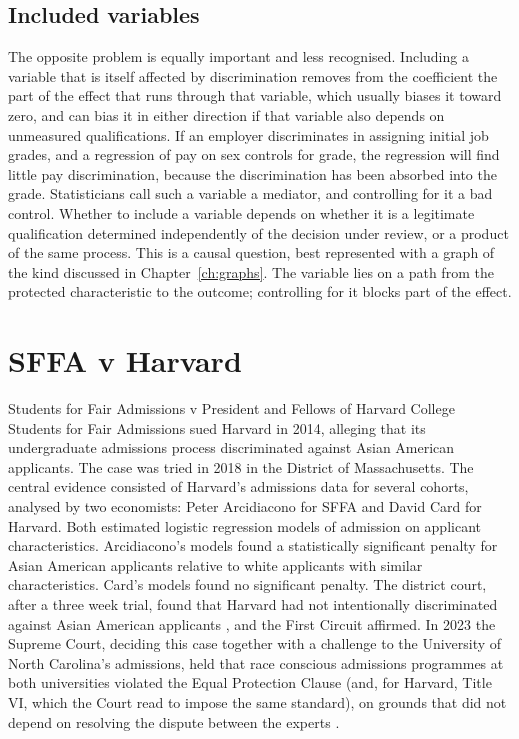 \subsection{Included variables}

The opposite problem is equally important and less recognised. Including a variable that is itself affected by discrimination removes from the coefficient the part of the effect that runs through that variable, which usually biases it toward zero, and can bias it in either direction if that variable also depends on unmeasured qualifications. If an employer discriminates in assigning initial job grades, and a regression of pay on sex controls for grade, the regression will find little pay discrimination, because the discrimination has been absorbed into the grade. Statisticians call such a variable a mediator, and controlling for it a bad control. Whether to include a variable depends on whether it is a legitimate qualification determined independently of the decision under review, or a product of the same process. This is a causal question, best represented with a graph of the kind discussed in Chapter~\ref{ch:graphs}. The variable lies on a path from the protected characteristic to the outcome; controlling for it blocks part of the effect.

\section{SFFA v Harvard}

\begin{casebox}{Students for Fair Admissions v President and Fellows of Harvard College}
Students for Fair Admissions sued Harvard in 2014, alleging that its undergraduate admissions process discriminated against Asian American applicants. The case was tried in 2018 in the District of Massachusetts. The central evidence consisted of Harvard's admissions data for several cohorts, analysed by two economists: Peter Arcidiacono for SFFA and David Card for Harvard. Both estimated logistic regression models of admission on applicant characteristics. Arcidiacono's models found a statistically significant penalty for Asian American applicants relative to white applicants with similar characteristics. Card's models found no significant penalty. The district court, after a three week trial, found that Harvard had not intentionally discriminated against Asian American applicants \citep{sffa2019}, and the First Circuit affirmed. In 2023 the Supreme Court, deciding this case together with a challenge to the University of North Carolina's admissions, held that race conscious admissions programmes at both universities violated the Equal Protection Clause (and, for Harvard, Title VI, which the Court read to impose the same standard), on grounds that did not depend on resolving the dispute between the experts \citep{sffa2023}.
\end{casebox}

